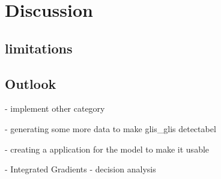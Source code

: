 


\section{Discussion}
\label{discussion}

\subsection{limitations}

\subsection{Outlook}
- implement other category

- generating some more data to make glis\_glis detectabel

- creating a application for the model to make it usable

- Integrated Gradients - decision analysis